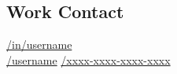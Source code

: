 \documentclass[american]{cv-class}
\begin{document}
\begin{aside}
	\section{Work Contact}
	\href{https://www.linkedin.com/in/username/}{/in/username} \\
	\href{https://www.researchgate.net/profile/username}{/username}	\href{https://orcid.org/XXXX-XXXX-XXXX-XXXX}{/xxxx-xxxx-xxxx-xxxx}
	~ 

\end{aside}
\end{document}
